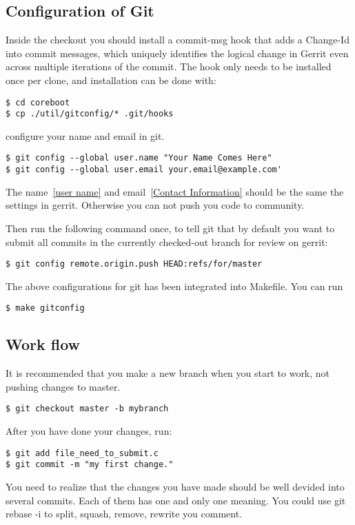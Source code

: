 \documentclass[titlepage,12pt]{article}
\begin{document}
{\subsection{Configuration of Git}
Inside the checkout you should install a commit-msg hook that adds a
Change-Id into commit messages, which uniquely identifies the logical
change in Gerrit even across multiple iterations of the commit. The
hook only needs to be installed once per clone, and installation can
be done with:
{ \small
\begin{verbatim}
$ cd coreboot
$ cp ./util/gitconfig/* .git/hooks
\end{verbatim}
}
configure your name and email in git.
{ \small
\begin{verbatim}
$ git config --global user.name "Your Name Comes Here"
$ git config --global user.email your.email@example.com'
\end{verbatim}
}
The name~\ref{user name} and email~\ref{Contact Information} should be the same the settings in gerrit.
Otherwise you can not push you code to community.

Then run the following command once, to tell git that by default you
want to submit all commits in the currently checked-out branch for
review on gerrit:
{ \small
\begin{verbatim}
$ git config remote.origin.push HEAD:refs/for/master
\end{verbatim}
}

The above configurations for git has been integrated into Makefile. You can run
{ \small
\begin{verbatim}
$ make gitconfig
\end{verbatim}
}

\subsection{Work flow}

It is recommended that you make a new branch when you start to work, not pushing changes to master.
{ \small
\begin{verbatim}
$ git checkout master -b mybranch
\end{verbatim}
}
After you have done your changes, run:
{ \small
\begin{verbatim}
$ git add file_need_to_submit.c
$ git commit -m "my first change."
\end{verbatim}
}

You need to realize that the changes you have made should be well devided into
several commits. Each of them has one and only one meaning. You could use git rebase -i to
split, squash, remove, rewrite you comment.

}
\end{document}
